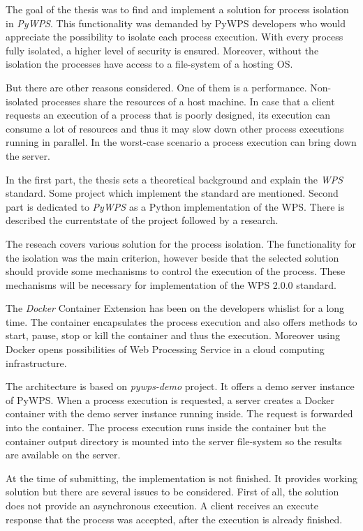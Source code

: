 \newpage
{}

The goal of the thesis was to find and implement a solution for
process isolation in \textit{PyWPS}. This functionality was demanded
by PyWPS developers who would appreciate the possibility to isolate
each process execution. With every process fully isolated, a higher
level of security is ensured. Moreover, without the isolation the
processes have access to a file-system of a hosting OS.

But there are other reasons considered. One of them is a
performance. Non-isolated processes share the resources of a host
machine. In case that a client requests an execution of a process that
is poorly designed, its execution can consume a lot of resources and
thus it may slow down other process executions running in parallel. In
the worst-case scenario a process execution can bring down the server.

In the first part, the thesis sets a theoretical background and
explain the \textit{WPS} standard. Some project which implement the
standard are mentioned. Second part is dedicated to \textit{PyWPS} as
a Python implementation of the WPS. There is described the
currentstate of the project followed by a research.

The reseach covers various solution for the process isolation. The
functionality for the isolation was the main criterion, however beside
that the selected solution should provide some mechanisms to control
the execution of the process. These mechanisms will be necessary for
implementation of the WPS 2.0.0 standard.

The \textit{Docker} Container Extension has been on the developers
whislist for a long time. The container encapsulates the process
execution and also offers methods to start, pause, stop or kill the
container and thus the execution. Moreover using Docker opens
possibilities of Web Processing Service in a cloud computing
infrastructure.

The architecture is based on \textit{pywps-demo} project. It offers a
demo server instance of PyWPS. When a process execution is requested,
a server creates a Docker container with the demo server instance
running inside. The request is forwarded into the container. The
process execution runs inside the container but the container output
directory is mounted into the server file-system so the results are
available on the server.

\newpage
At the time of submitting, the implementation is not finished. It
provides working solution but there are several issues to be
considered. First of all, the solution does not provide an
asynchronous execution. A client receives an execute response that the
process was accepted, after the execution is already finished.

